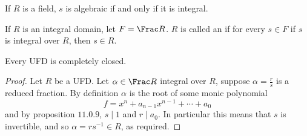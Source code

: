 \documentclass[10pt]{article}
\def\divides{{\mid}}
\begin{document}
If $R$ is a field, $s$ is algebraic if and only if it is integral.

\begin{defn*}

    If $R$ is an integral domain, let $F=\Frac R$.
    $R$ is called an  if for every $s\in F$ if $s$ is integral over $R$, then $s\in R$.

\end{defn*}

\begin{prop*}

    Every UFD is completely closed.

\end{prop*}

\begin{proof}

    Let $R$ be a UFD.
    Let $\alpha\in\Frac R$ integral over $R$, suppose $\alpha=\frac rs$ is a reduced fraction.
    By definition $\alpha$ is the root of some monic polynomial
    \[ f=x^n+a_{n-1}x^{n-1} + \cdots + a_0 \]
    and by proposition $11.0.9$, $s\divides1$ and $r\divides a_0$.
    In particular this means that $s$ is invertible, and so $\alpha=rs^{-1}\in R$, as required.

\end{proof}
\end{document}
